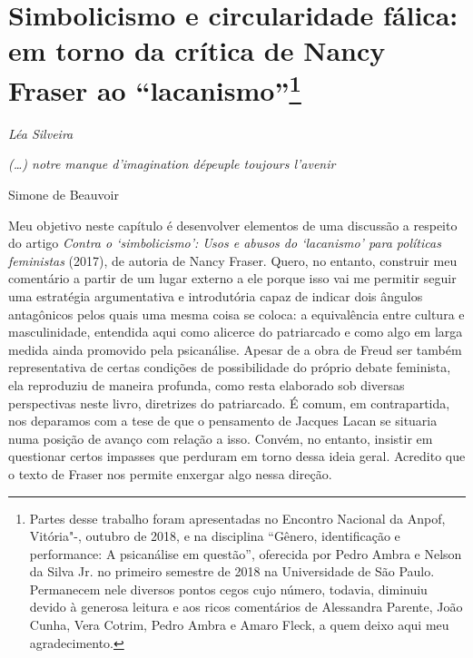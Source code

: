 \chapter*{Simbolicismo e circularidade fálica: em torno da crítica de
Nancy Fraser ao ``lacanismo''\footnote{Partes desse trabalho foram
  apresentadas no  Encontro Nacional da Anpof, Vitória"-, outubro
  de 2018, e na disciplina ``Gênero, identificação e performance: A
  psicanálise em questão'', oferecida por Pedro Ambra e Nelson da Silva
  Jr. no primeiro semestre de 2018 na Universidade de São Paulo.
  Permanecem nele diversos pontos cegos cujo número, todavia, diminuiu
  devido à generosa leitura e aos ricos comentários de Alessandra
  Parente, João Cunha, Vera Cotrim, Pedro Ambra e Amaro Fleck, a quem
  deixo aqui meu agradecimento.}}



\begin{flushright}
\emph{Léa Silveira}
\end{flushright}

\epigraph{\emph{(\ldots{}) notre manque d'imagination dépeuple toujours l'avenir}}{Simone de Beauvoir}

Meu objetivo neste capítulo é desenvolver elementos de uma discussão a
respeito do artigo \emph{Contra o `simbolicismo': Usos e abusos do
`lacanismo' para políticas feministas} (2017), de autoria de Nancy
Fraser. Quero, no entanto, construir meu comentário a partir de um lugar
externo a ele porque isso vai me permitir seguir uma estratégia
argumentativa e introdutória capaz de indicar dois ângulos antagônicos
pelos quais uma mesma coisa se coloca: a equivalência entre cultura e
masculinidade, entendida aqui como alicerce do patriarcado e como algo
em larga medida ainda promovido pela psicanálise. Apesar de a obra de
Freud ser também representativa de certas condições de possibilidade do
próprio debate feminista, ela reproduziu de maneira profunda, como resta
elaborado sob diversas perspectivas neste livro, diretrizes do
patriarcado. É comum, em contrapartida, nos deparamos com a tese de que
o pensamento de Jacques Lacan se situaria numa posição de avanço com
relação a isso. Convém, no entanto, insistir em questionar certos
impasses que perduram em torno dessa ideia geral. Acredito que o texto
de Fraser nos permite enxergar algo nessa direção.

